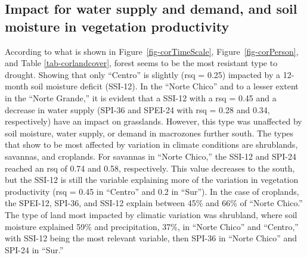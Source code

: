 \documentclass[
  authoryear,
  preprint,
  3p,
  onecolumn]{elsarticle}
\begin{document}
\hypertarget{impact-for-water-supply-and-demand-and-soil-moisture-in-vegetation-productivity}{%
\subsection{Impact for water supply and demand, and soil moisture in
vegetation
productivity}\label{impact-for-water-supply-and-demand-and-soil-moisture-in-vegetation-productivity}}

According to what is shown in Figure~\ref{fig-corTimeScale},
Figure~\ref{fig-corPerson}, and Table \ref{tab-corlandcover}, forest
seems to be the most resistant type to drought. Showing that only
``Centro'' is slightly (rsq = 0.25) impacted by a 12-month soil moisture
deficit (SSI-12). In the ``Norte Chico'' and to a lesser extent in the
``Norte Grande,'' it is evident that a SSI-12 with a rsq = 0.45 and a
decrease in water supply (SPI-36 and SPEI-24 with rsq = 0.28 and 0.34,
respectively) have an impact on grasslands. However, this type was
unaffected by soil moisture, water supply, or demand in macrozones
further south. The types that show to be most affected by variation in
climate conditions are shrublands, savannas, and croplands. For savannas
in ``Norte Chico,'' the SSI-12 and SPI-24 reached an rsq of 0.74 and
0.58, respectively. This value decreases to the south, but the SSI-12 is
still the variable explaining more of the variation in vegetation
productivity (rsq = 0.45 in ``Centro'' and 0.2 in ``Sur''). In the case
of croplands, the SPEI-12, SPI-36, and SSI-12 explain between 45\% and
66\% of ``Norte Chico.'' The type of land most impacted by climatic
variation was shrubland, where soil moisture explained 59\% and
precipitation, 37\%, in ``Norte Chico'' and ``Centro,'' with SSI-12
being the most relevant variable, then SPI-36 in ``Norte Chico'' and
SPI-24 in ``Sur.''
\end{document}
